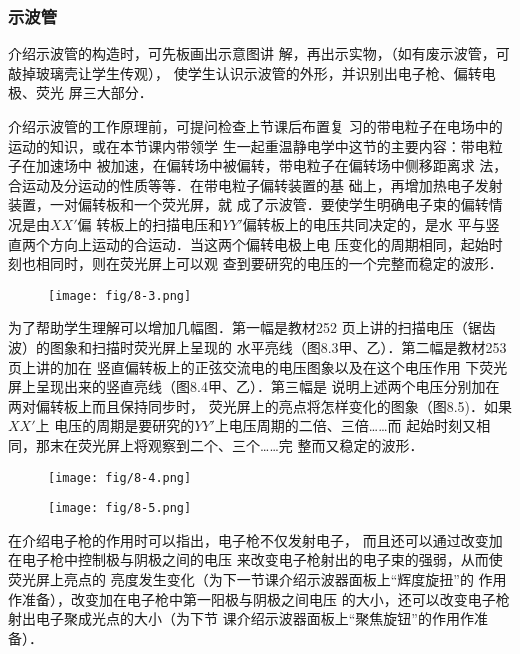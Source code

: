 \subsubsection{示波管} 

介绍示波管的构造时，可先板画出示意图讲
解，再出示实物，（如有废示波管，可敲掉玻璃壳让学生传观），
使学生认识示波管的外形，并识别出电子枪、偏转电极、荧光
屏三大部分．

介绍示波管的工作原理前，可提问检查上节课后布置复
习的带电粒子在电场中的运动的知识，或在本节课内带领学
生一起重温静电学中这节的主要内容：带电粒子在加速场中
被加速，在偏转场中被偏转，带电粒子在偏转场中侧移距离求
法，合运动及分运动的性质等等．在带电粒子偏转装置的基
础上，再增加热电子发射装置，一对偏转板和一个荧光屏，就
成了示波管．要使学生明确电子束的偏转情况是由$XX'$偏
转板上的扫描电压和$YY'$偏转板上的电压共同决定的，是水
平与竖直两个方向上运动的合运动．当这两个偏转电极上电
压变化的周期相同，起始时刻也相同时，则在荧光屏上可以观
查到要研究的电压的一个完整而稳定的波形．

\begin{figure}[htp]
    \centering
\texttt{[image: fig/8-3.png]}
    \caption{}
\end{figure}

为了帮助学生理解可以增加几幅图．第一幅是教材252
页上讲的扫描电压（锯齿波）的图象和扫描时荧光屏上呈现的
水平亮线（图8.3甲、乙）．第二幅是教材253页上讲的加在
竖直偏转板上的正弦交流电的电压图象以及在这个电压作用
下荧光屏上呈现出来的竖直亮线（图8.4甲、乙）．第三幅是
说明上述两个电压分别加在两对偏转板上而且保持同步时，
荧光屏上的亮点将怎样变化的图象（图8.5)．如果$XX'$上
电压的周期是要研究的$YY'$上电压周期的二倍、三倍……而
起始时刻又相同，那末在荧光屏上将观察到二个、三个……完
整而又稳定的波形．
\begin{figure}[htp]
    \centering
\texttt{[image: fig/8-4.png]}
    \caption{}
\end{figure}

\begin{figure}[htp]
    \centering
\texttt{[image: fig/8-5.png]}
    \caption{}
\end{figure}

在介绍电子枪的作用时可以指出，电子枪不仅发射电子，
而且还可以通过改变加在电子枪中控制极与阴极之间的电压
来改变电子枪射出的电子束的强弱，从而使荧光屏上亮点的
亮度发生变化（为下一节课介绍示波器面板上“辉度旋扭”的
作用作准备），改变加在电子枪中第一阳极与阴极之间电压
的大小，还可以改变电子枪射出电子聚成光点的大小（为下节
课介绍示波器面板上“聚焦旋钮”的作用作准备）．

